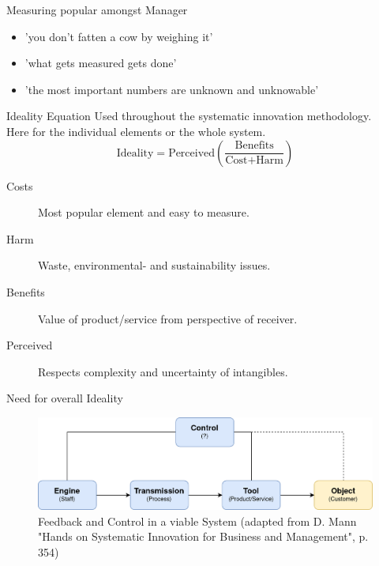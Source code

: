 \documentclass{beamer}
\begin{document}
	\begin{frame}{Measuring popular amongst Manager}
		\begin{itemize}
			\item 'you don’t fatten a cow by weighing it'
			\item 'what gets measured gets done'
			\item 'the most important numbers are unknown and unknowable'
		\end{itemize}
	\end{frame}
	
	\begin{frame}{Ideality Equation}
		Used throughout the systematic innovation methodology. \\ Here for the individual elements or the whole system.
		\begin{equation*}
			\text{Ideality} = \text{Perceived} \left(\frac{\text{Benefits}}{\text{Cost} + \text{Harm}}\right)
		\end{equation*}
		\begin{description}
			\item[Costs] Most popular element and easy to measure.
			\item[Harm] Waste, environmental- and sustainability issues.
			\item[Benefits] Value of product/service from perspective of receiver.
			\item[Perceived] Respects complexity and uncertainty of intangibles.
		\end{description}
	\end{frame}

	\begin{frame}{Need for overall Ideality}
		\begin{figure}
			\centering
			\includegraphics[width=\textwidth]{img/control3.png}
			\caption{Feedback and Control in a viable System (adapted from D. Mann "Hands on Systematic Innovation for Business and Management", p. 354)}
		\end{figure}
	\end{frame}
\end{document}
